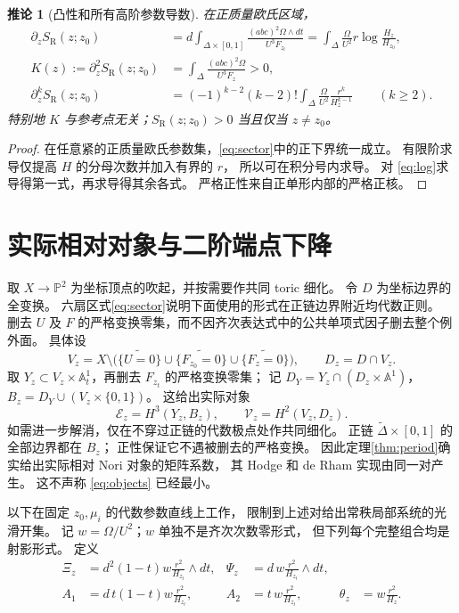 \documentclass[11pt,a4paper]{ctexart}
\theoremstyle{cnplain}
\newtheorem{corollary}[theorem]{推论}
\theoremstyle{remark}\newtheorem{remark}[theorem]{注}
\newcommand{\A}{\mathbb A}
\newcommand{\PP}{\mathbb P}
\newcommand{\SR}{S_{\mathrm R}}
\begin{document}
\begin{corollary}[凸性和所有高阶参数导数]\label{cor:derivatives}
在正质量欧氏区域，
\begin{align}
 \partial_z\SR(z;z_0)
 &=d\int_{\Delta\times[0,1]}
             \frac{(abc)^2\Omega\wedge dt}{U^3F_{z_t}}
   =\int_\Delta\frac{\Omega}{U^2}r\log\frac{H_z}{H_{z_0}},\label{eq:first}\\
 K(z):=\partial_z^2\SR(z;z_0)
 &=\int_\Delta\frac{(abc)^2\Omega}{U^3F_z}>0,\label{eq:second}\\
 \partial_z^k\SR(z;z_0)
 &=(-1)^{k-2}(k-2)!
       \int_\Delta\frac{\Omega}{U^2}\frac{r^k}{H_z^{k-1}}\qquad(k\geq2).
                                                        \label{eq:higher}
\end{align}
特别地 $K$ 与参考点无关；$\SR(z;z_0)>0$ 当且仅当 $z\ne z_0$。
\end{corollary}
\begin{proof}
在任意紧的正质量欧氏参数集，\eqref{eq:sector}中的正下界统一成立。
有限阶求导仅提高 $H$ 的分母次数并加入有界的 $r$，
所以可在积分号内求导。
对 \eqref{eq:log}求导得第一式，再求导得其余各式。
严格正性来自正单形内部的严格正核。
\end{proof}

\section{实际相对对象与二阶端点下降}\label{sec:motive}
取 $X\to\PP^2$ 为坐标顶点的吹起，并按需要作共同 toric 细化。
令 $D$ 为坐标边界的全变换。
六扇区式\eqref{eq:sector}说明下面使用的形式在正链边界附近均代数正则。
删去 $U$ 及 $F$ 的严格变换零集，而不因齐次表达式中的公共单项式因子删去整个例外面。
具体设
\[
 V_z=X\setminus\bigl(\widetilde{\{U=0\}}\cup
        \widetilde{\{F_{z_0}=0\}}\cup\widetilde{\{F_z=0\}}\bigr),
 \qquad D_z=D\cap V_z.
\]
取 $Y_z\subset V_z\times\A^1_t$，再删去 $F_{z_t}$ 的严格变换零集；
记 $D_Y=Y_z\cap(D_z\times\A^1)$，
$B_z=D_Y\cup(V_z\times\{0,1\})$。
这给出实际对象
\begin{equation}\label{eq:objects}
 \mathcal E_z=H^3(Y_z,B_z),\qquad
 \mathcal V_z=H^2(V_z,D_z).
\end{equation}
如需进一步解消，仅在不穿过正链的代数极点处作共同细化。
正链 $\widetilde\Delta\times[0,1]$ 的全部边界都在 $B_z$；
正性保证它不遇被删去的严格变换。
因此定理\ref{thm:period}确实给出实际相对 Nori 对象的矩阵系数，
其 Hodge 和 de Rham 实现由同一对产生。
这不声称 \eqref{eq:objects} 已经最小。

以下在固定 $z_0,\mu_i$ 的代数参数直线上工作，
限制到上述对给出常秩局部系统的光滑开集。
记 $w=\Omega/U^2$；$w$ 单独不是齐次次数零形式，
但下列每个完整组合均是射影形式。
定义
\begin{align}
 \Xi_z&=d^2(1-t)w\frac{r^2}{H_{z_t}}\wedge dt,&
 \Psi_z&=d\,w\frac{r^2}{H_{z_t}}\wedge dt,\label{eq:forms}\\
 A_1&=d\,t(1-t)w\frac{r^2}{H_{z_t}},&
 A_2&=t\,w\frac{r^2}{H_{z_t}},&
 \theta_z&=w\frac{r^2}{H_z}.\label{eq:primitives}
\end{align}
\end{document}

